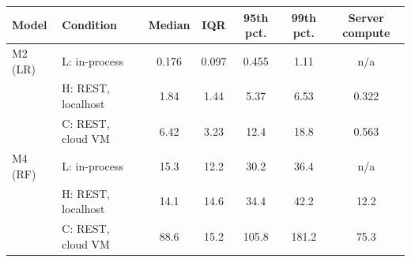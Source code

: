 \begin{tabular}{llccccc}
\toprule
Model & Condition & Median & IQR & 95th pct. & 99th pct. & Server compute \\
\midrule
M2 (LR) & L: in-process & 0.176 & 0.097 & 0.455 & 1.11 & n/a \\
 & H: REST, localhost & 1.84 & 1.44 & 5.37 & 6.53 & 0.322 \\
 & C: REST, cloud VM & 6.42 & 3.23 & 12.4 & 18.8 & 0.563 \\
\addlinespace
M4 (RF) & L: in-process & 15.3 & 12.2 & 30.2 & 36.4 & n/a \\
 & H: REST, localhost & 14.1 & 14.6 & 34.4 & 42.2 & 12.2 \\
 & C: REST, cloud VM & 88.6 & 15.2 & 105.8 & 181.2 & 75.3 \\
\bottomrule
\end{tabular}
